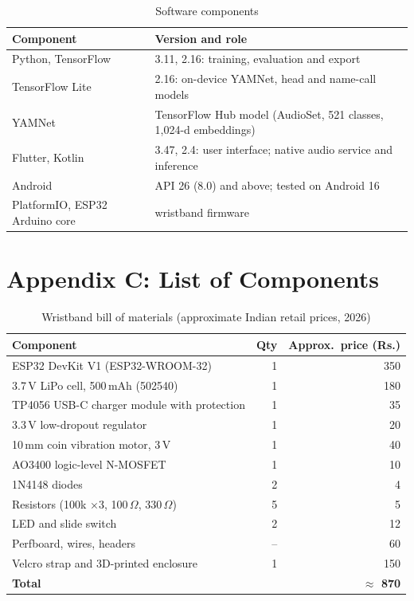 \documentclass[12pt,a4paper,oneside]{report}
\begin{document}
\begin{table}[h]
\caption{Software components}
\label{tab:software}
\centering\small
\begin{tabularx}{\textwidth}{@{}lX@{}}
\toprule
Component & Version and role\\
\midrule
Python, TensorFlow & 3.11, 2.16: training, evaluation and export\\
TensorFlow Lite & 2.16: on-device YAMNet, head and name-call models\\
YAMNet & TensorFlow Hub model (AudioSet, 521 classes, 1,024-d embeddings)\\
Flutter, Kotlin & 3.47, 2.4: user interface; native audio service and inference\\
Android & API 26 (8.0) and above; tested on Android 16\\
PlatformIO, ESP32 Arduino core & wristband firmware\\
\bottomrule
\end{tabularx}
\end{table}

\clearpage
\renewcommand{\thetable}{C.\arabic{table}}\setcounter{table}{0}
\chapter*{Appendix C: List of Components}
\begin{table}[h]
\caption{Wristband bill of materials (approximate Indian retail prices, 2026)}
\label{tab:bom}
\centering\small
\begin{tabular}{@{}lrr@{}}
\toprule
Component & Qty & Approx.\ price (Rs.)\\
\midrule
ESP32 DevKit V1 (ESP32-WROOM-32) & 1 & 350\\
3.7\,V LiPo cell, 500\,mAh (502540) & 1 & 180\\
TP4056 USB-C charger module with protection & 1 & 35\\
3.3\,V low-dropout regulator & 1 & 20\\
10\,mm coin vibration motor, 3\,V & 1 & 40\\
AO3400 logic-level N-MOSFET & 1 & 10\\
1N4148 diodes & 2 & 4\\
Resistors (100k $\times$3, 100\,$\Omega$, 330\,$\Omega$) & 5 & 5\\
LED and slide switch & 2 & 12\\
Perfboard, wires, headers & -- & 60\\
Velcro strap and 3D-printed enclosure & 1 & 150\\
\midrule
\textbf{Total} & & \textbf{$\approx$ 870}\\
\bottomrule
\end{tabular}
\end{table}
\end{document}
